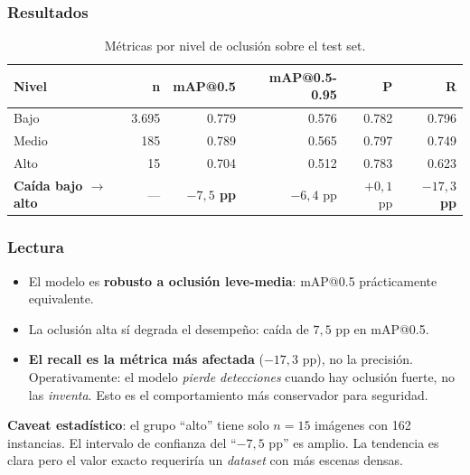 \documentclass[journal,onecolumn,11pt]{IEEEtran}
\begin{document}
\subsubsection{Resultados}

\begin{table}[H]
\centering
\caption{Métricas por nivel de oclusión sobre el test set.}
\label{tab:oclusion}
\begin{tabular}{l r r r r r}
\toprule
\textbf{Nivel} & \textbf{n} & \textbf{mAP@0.5}
& \textbf{mAP@0.5-0.95} & \textbf{P} & \textbf{R} \\
\midrule
Bajo & 3.695 & 0.779 & 0.576 & 0.782 & 0.796 \\
Medio & 185 & 0.789 & 0.565 & 0.797 & 0.749 \\
Alto & 15 & 0.704 & 0.512 & 0.783 & 0.623 \\
\midrule
\textbf{Caída bajo $\to$ alto} & — & \textbf{$-7{,}5$ pp} & $-6{,}4$ pp
& $+0{,}1$ pp & \textbf{$-17{,}3$ pp} \\
\bottomrule
\end{tabular}
\end{table}

\subsubsection{Lectura}

\begin{itemize}[leftmargin=*]
    \item El modelo es \textbf{robusto a oclusión leve-media}:
    mAP@0.5 prácticamente equivalente.
    \item La oclusión alta sí degrada el desempeño: caída de
    $7{,}5$ pp en mAP@0.5.
    \item \textbf{El recall es la métrica más afectada}
    ($-17{,}3$ pp), no la precisión. Operativamente: el modelo
    \emph{pierde detecciones} cuando hay oclusión fuerte, no las
    \emph{inventa}. Esto es el comportamiento más conservador para
    seguridad.
\end{itemize}

\begin{nota}
\textbf{Caveat estadístico}: el grupo ``alto'' tiene solo $n=15$
imágenes con 162 instancias. El intervalo de confianza del
``$-7{,}5$ pp'' es amplio. La tendencia es clara pero el valor
exacto requeriría un \textit{dataset} con más escenas densas.
\end{nota}

\end{document}
